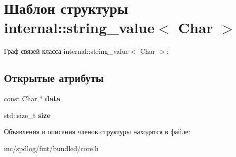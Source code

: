 \hypertarget{structinternal_1_1string__value}{}\section{Шаблон структуры internal\+:\+:string\+\_\+value$<$ Char $>$}
\label{structinternal_1_1string__value}


Граф связей класса internal\+:\+:string\+\_\+value$<$ Char $>$\+:
\subsection*{Открытые атрибуты}
\begin{DoxyCompactItemize}
\item 
\mbox{\label{structinternal_1_1string__value_ad857f8ff707d75e69f44b02429cfe9a3}} 
const Char $\ast$ {\bfseries data}
\item 
\mbox{\label{structinternal_1_1string__value_a6f416973ea8f719f71d8ff9dbbdcac77}} 
std\+::size\+\_\+t {\bfseries size}
\end{DoxyCompactItemize}


Объявления и описания членов структуры находятся в файле\+:\begin{DoxyCompactItemize}
\item 
inc/spdlog/fmt/bundled/core.\+h\end{DoxyCompactItemize}
